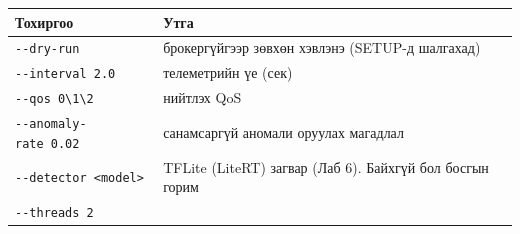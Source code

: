 \begingroup\scriptsize\begin{longtable}[]{@{}ll@{}}
\toprule
\begin{minipage}[b]{0.47\columnwidth}\raggedright
Тохиргоо\strut
\end{minipage} & \begin{minipage}[b]{0.47\columnwidth}\raggedright
Утга\strut
\end{minipage}\tabularnewline
\midrule
\endhead
\begin{minipage}[t]{0.47\columnwidth}\raggedright
\texttt{-\/-dry-run}\strut
\end{minipage} & \begin{minipage}[t]{0.47\columnwidth}\raggedright
брокергүйгээр зөвхөн хэвлэнэ (SETUP-д шалгахад)\strut
\end{minipage}\tabularnewline
\begin{minipage}[t]{0.47\columnwidth}\raggedright
\texttt{-\/\allowbreak{}-interval\ 2.\allowbreak{}0}\strut
\end{minipage} & \begin{minipage}[t]{0.47\columnwidth}\raggedright
телеметрийн үе (сек)\strut
\end{minipage}\tabularnewline
\begin{minipage}[t]{0.47\columnwidth}\raggedright
\texttt{-\/-qos\ 0\textbackslash{}\textbar{}1\textbackslash{}\textbar{}2}\strut
\end{minipage} & \begin{minipage}[t]{0.47\columnwidth}\raggedright
нийтлэх QoS\strut
\end{minipage}\tabularnewline
\begin{minipage}[t]{0.47\columnwidth}\raggedright
\texttt{-\/\allowbreak{}-anomaly-rate\ 0.\allowbreak{}02}\strut
\end{minipage} & \begin{minipage}[t]{0.47\columnwidth}\raggedright
санамсаргүй аномали оруулах магадлал\strut
\end{minipage}\tabularnewline
\begin{minipage}[t]{0.47\columnwidth}\raggedright
\texttt{-\/\allowbreak{}-detector\ \textless{}model\textgreater{}}\strut
\end{minipage} & \begin{minipage}[t]{0.47\columnwidth}\raggedright
TFLite (LiteRT) загвар (Лаб 6). Байхгүй бол босгын горим\strut
\end{minipage}\tabularnewline
\begin{minipage}[t]{0.47\columnwidth}\raggedright
\texttt{-\/-threads\ 2}\strut

\end{minipage}
\end{longtable}

